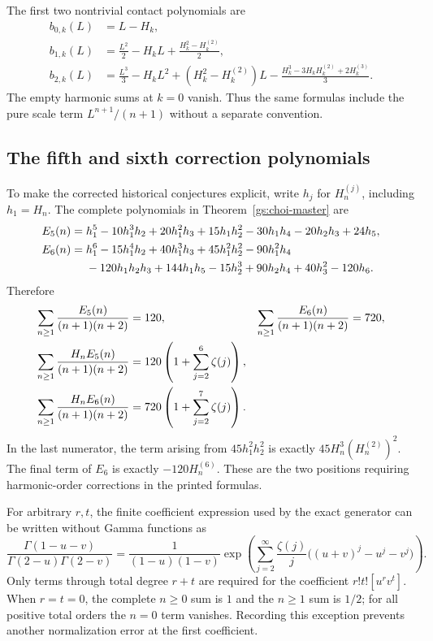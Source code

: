 The first two nontrivial contact polynomials are
\begin{align}
 b_{0,k}(L)&=L-H_k,\\
 b_{1,k}(L)&=\frac{L^2}{2}-H_kL
           +\frac{H_k^2-H_k^{(2)}}2,\\
 b_{2,k}(L)&=\frac{L^3}{3}-H_kL^2
       +(H_k^2-H_k^{(2)})L
       -\frac{H_k^3-3H_kH_k^{(2)}+2H_k^{(3)}}3.
 \label{eq:contact-first-rows}
\end{align}
The empty harmonic sums at $k=0$ vanish.  Thus the same formulas include
the pure scale term $L^{n+1}/(n+1)$ without a separate convention.

\subsection{The fifth and sixth correction polynomials}

To make the corrected historical conjectures explicit, write $h_j$ for
$H_n^{(j)}$, including $h_1=H_n$.  The complete polynomials in
Theorem~\ref{gs:choi-master} are
\begin{align}
 E_5(n)={}&h_1^5-10h_1^3h_2+20h_1^2h_3+15h_1h_2^2
           -30h_1h_4-20h_2h_3+24h_5,\label{eq:E5}\\
 E_6(n)={}&h_1^6-15h_1^4h_2+40h_1^3h_3+45h_1^2h_2^2
           -90h_1^2h_4\notag\\
 &-120h_1h_2h_3+144h_1h_5-15h_2^3
           +90h_2h_4+40h_3^2-120h_6.\label{eq:E6}
\end{align}
Therefore
\begin{align}
 \sum_{n\ge1}\frac{E_5(n)}{(n+1)(n+2)}&=120,&
 \sum_{n\ge1}\frac{E_6(n)}{(n+1)(n+2)}&=720,\\
 \sum_{n\ge1}\frac{H_nE_5(n)}{(n+1)(n+2)}
   &=120\left(1+\sum_{j=2}^{6}\zeta(j)\right),\notag\\
 \sum_{n\ge1}\frac{H_nE_6(n)}{(n+1)(n+2)}
   &=720\left(1+\sum_{j=2}^{7}\zeta(j)\right).
 \label{eq:corrected-five-six}
\end{align}
In the last numerator, the term arising from $45h_1^2h_2^2$ is exactly
$45H_n^3(H_n^{(2)})^2$.  The final term of $E_6$ is exactly
$-120H_n^{(6)}$.  These are the two positions requiring harmonic-order
corrections in the printed formulas.

For arbitrary $r,t$, the finite coefficient expression used by the
exact generator can be written without Gamma functions as
\begin{equation}\label{eq:choi-exact-generator}
 \frac{\Gamma(1-u-v)}{\Gamma(2-u)\Gamma(2-v)}
 =\frac1{(1-u)(1-v)}
 \exp\left(\sum_{j=2}^{\infty}\frac{\zeta(j)}j
       \bigl((u+v)^j-u^j-v^j\bigr)\right).
\end{equation}
Only terms through total degree $r+t$ are required for the coefficient
$r!t![u^rv^t]$.  When $r=t=0$, the complete $n\ge0$ sum is $1$ and
the $n\ge1$ sum is $1/2$; for all positive total orders the $n=0$ term
vanishes.  Recording this exception prevents another normalization
error at the first coefficient.
